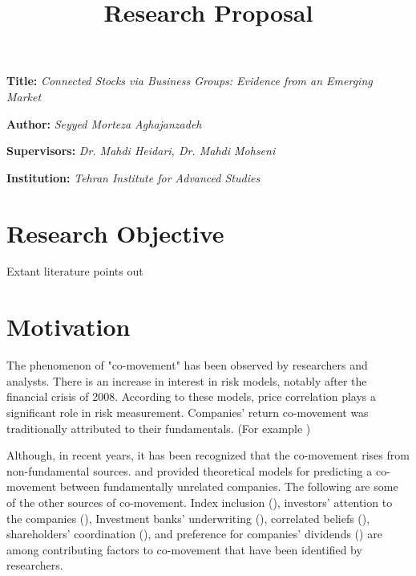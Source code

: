 \documentclass[12pt, a4paper]{article}
\title{\textbf{Research Proposal}}
\author{}
\date{}
\newcommand{\namelistlabel}[1]{\mbox{#1}\hfil}
\newenvironment{namelist}[1]{%
	\begin{list}{}
		{
			\let\makelabel\namelistlabel
			\settowidth{\labelwidth}{#1}
			\setlength{\leftmargin}{1.1\labelwidth}
		}
	}{%
\end{list}}
\begin{document}
\maketitle
\begin{namelist}{xxxxxxxxxxxx}
	\item[{\bf Title:}]
	\textit{Connected Stocks via Business Groups: Evidence from an Emerging Market }
	\item[{\bf Author:}]
	\textit{	Seyyed Morteza Aghajanzadeh}
	\item[{\bf Supervisors:}]
	\textit{	Dr. Mahdi Heidari, Dr. Mahdi Mohseni}
	\item[{\bf Institution:}]
	\textit{	Tehran Institute for Advanced Studies}
\end{namelist}


\section*{Research Objective}
Extant literature points out 
\section*{Motivation}
	{The phenomenon of "co-movement" has been observed by researchers and analysts. There is an increase in interest in risk models, notably after the financial crisis of 2008. According to these models, price correlation plays a significant role in risk measurement. Companies' return co-movement was traditionally attributed to their fundamentals. (For example {\cite{shiller1989comovements}})} 
	
	Although, in recent years, it has been recognized that the co-movement rises from non-fundamental sources. {\cite{barberis2003style} and \cite{barberis2005comovement}} provided theoretical models for predicting a co-movement between fundamentally unrelated companies.
	The following are some of the other sources of co-movement. Index inclusion ({\cite{barberis2005comovement}}), investors' attention to the companies ({\cite{wu2014investor}}), Investment banks' underwriting ({\cite{grullon2014comovement}}), correlated beliefs ({\cite{david2016correlated}}), shareholders' coordination ({\cite{pantzalis2017shareholder}}), and preference for companies' dividends ({\cite{HAMEED2019103}}) are among contributing factors to co-movement that have been identified by researchers.
	
\end{document}
